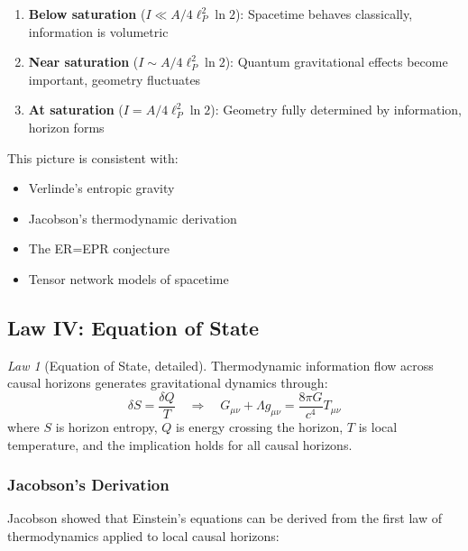 \documentclass[11pt,a4paper]{article}
\theoremstyle{plain}
\theoremstyle{definition}
\theoremstyle{remark}
\newtheorem{law}{Law}
\begin{document}
\begin{enumerate}[leftmargin=*]
\item \textbf{Below saturation} ($I \ll A/4\ell_P^2\ln 2$): Spacetime behaves classically, information is volumetric
\item \textbf{Near saturation} ($I \sim A/4\ell_P^2\ln 2$): Quantum gravitational effects become important, geometry fluctuates
\item \textbf{At saturation} ($I = A/4\ell_P^2\ln 2$): Geometry fully determined by information, horizon forms
\end{enumerate}

This picture is consistent with:
\begin{itemize}[leftmargin=*]
\item Verlinde's entropic gravity \cite{verlinde2011origin}
\item Jacobson's thermodynamic derivation \cite{jacobson1995thermodynamics}
\item The ER=EPR conjecture \cite{maldacena2013cool}
\item Tensor network models of spacetime \cite{swingle2012entanglement}
\end{itemize}

\subsection{Law IV: Equation of State}

\begin{law}[Equation of State, detailed]
Thermodynamic information flow across causal horizons generates gravitational dynamics through:
\begin{equation}
\delta S = \frac{\delta Q}{T} \quad \Longrightarrow \quad G_{\mu\nu} + \Lambda g_{\mu\nu} = \frac{8\pi G}{c^4}T_{\mu\nu}
\label{eq:eos_detailed}
\end{equation}
where $S$ is horizon entropy, $Q$ is energy crossing the horizon, $T$ is local temperature, and the implication holds for all causal horizons.
\end{law}

\subsubsection{Jacobson's Derivation}

Jacobson \cite{jacobson1995thermodynamics} showed that Einstein's equations can be derived from the first law of thermodynamics applied to local causal horizons:
\end{document}
